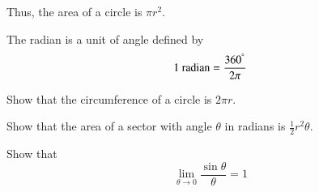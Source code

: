 Thus, the area of a circle is $\pi r^2$.
\begin{definition}
	The radian is a unit of angle defined by
\begin{equation}
	1 \text{ radian} = \frac{360^{\degree}}{2\pi}
\end{equation}
\end{definition}
%
\begin{problem}
	Show that the circumference of a circle is $2 \pi r$.
\end{problem}
\begin{problem}
	Show that the area of a sector with angle $\theta$ in radians is $\frac{1}{2}r^2\theta$.
\end{problem}
\begin{problem}
	Show that
	\begin{equation}
	\lim_{\theta \rightarrow 0} \frac{\sin\theta}{\theta} = 1
	\end{equation}
\end{problem}
